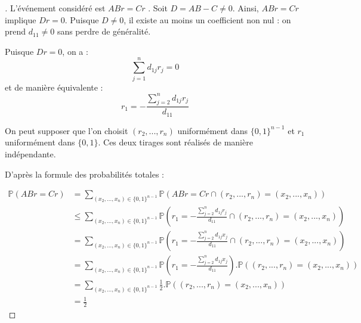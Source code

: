 %
%

\begin{proof}[]
 L'événement considéré est \og $ABr=Cr$ \fg.  Soit $D=AB-C\neq 0$. Ainsi, $ABr=Cr$ implique $Dr=0$. Puisque $D\neq 0$, il existe au moins un coefficient non nul : on prend $d_{11}\neq 0$ sans perdre de généralité.
 
Puisque $Dr=0$, on a :
$$
\sum_{j=1}^n d_{1j}r_j=0
$$
et de manière équivalente  :
\begin{equation}
r_1 = - \frac{\sum_{j=2}^n d_{1j}r_j}{d_{11}}
\end{equation}

On peut supposer que l'on choisit $(r_2,...,r_n)$ uniformément dans $\{0,1\}^{n-1}$ et $r_1$ uniformément dans $\{0,1\}$. Ces deux tirages sont réalisés de manière indépendante.

D'après la formule des probabilités totales :

\begin{align*}
\mathbb{P}(ABr=Cr)
&= \sum_{(x_2,...,x_n) \in \{0,1\}^{n-1}} \mathbb{P}(ABr=Cr \cap (r_2,...,r_n) = (x_2,...,x_n)) \\
&\leq \sum_{(x_2,...,x_n) \in \{0,1\}^{n-1}} \mathbb{P}\left(r_1 = - \frac{\sum_{j=2}^n d_{1j}r_j}{d_{11}}
\cap (r_2,...,r_n) = (x_2,...,x_n)\right) \\
&= \sum_{(x_2,...,x_n) \in \{0,1\}^{n-1}} \mathbb{P}\left(r_1 = - \frac{\sum_{j=2}^n d_{1j}x_j}{d_{11}}
\cap (r_2,...,r_n) = (x_2,...,x_n)\right) \\
&= \sum_{(x_2,...,x_n) \in \{0,1\}^{n-1}} \mathbb{P}\left(r_1 = - \frac{\sum_{j=2}^n d_{1j}x_j}{d_{11}}\right) .
\mathbb{P}\left( (r_2,...,r_n) = (x_2,...,x_n)\right) \\
&= \sum_{(x_2,...,x_n) \in \{0,1\}^{n-1}} \frac{1}{2} .
\mathbb{P}\left( (r_2,...,r_n) = (x_2,...,x_n)\right) \\
&=\frac{1}{2}
\end{align*}
\end{proof}


